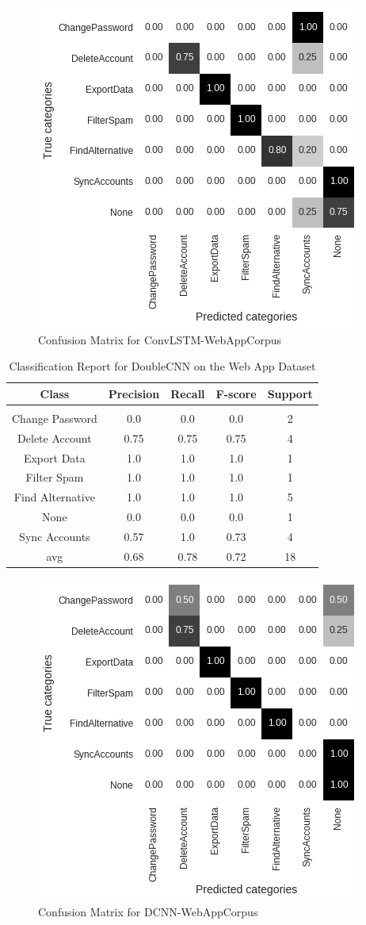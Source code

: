 \documentclass[11pt, oneside]{article}   	%
\begin{document}
\begin{figure}[h]
\centering
\includegraphics[width=0.6\linewidth]{ConvLSTM-WebAppCorpus}
\caption{Confusion Matrix for ConvLSTM-WebAppCorpus}
\label{fig:ConvLSTM-WebAppCorpus}
\end{figure}

\newpage
\begin{table}[h]
\centering
\caption{Classification Report for DoubleCNN on the Web App Dataset}
\begin{tabular}{c | c c c c}
Class & Precision & Recall & F-score & Support\\
\hline
\hline\\
Change Password & 0.0 & 0.0 & 0.0 & 2\\
Delete Account & 0.75 & 0.75 & 0.75 & 4\\
Export Data & 1.0 & 1.0 & 1.0 & 1\\
Filter Spam & 1.0 & 1.0 & 1.0 & 1\\
Find Alternative & 1.0 & 1.0 & 1.0 & 5\\
None & 0.0 & 0.0 & 0.0 & 1\\
Sync Accounts & 0.57 & 1.0 & 0.73 & 4\\
avg & 0.68 & 0.78 & 0.72 & 18\\
\end{tabular}
\end{table}

\begin{figure}[h]
\centering
\includegraphics[width=0.6\linewidth]{DCNN-WebAppCorpus}
\caption{Confusion Matrix for DCNN-WebAppCorpus}
\label{fig:DCNN-WebAppCorpus}
\end{figure}

\newpage
\listoffigures

\newpage
\listoftables

\newpage
\nocite{*} 


\end{document}
